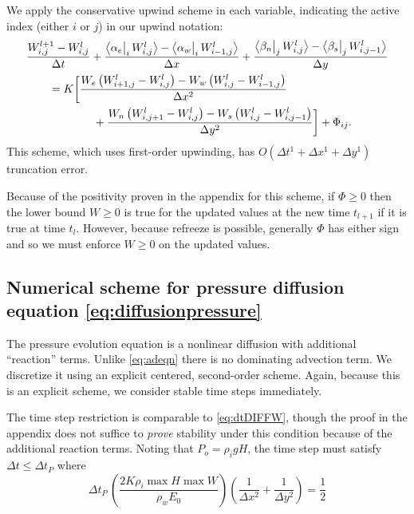 \documentclass[11pt,final]{amsart}%
\newcommand{\Wlij}{W^l_{i,j}}
\newcommand{\upp}[3]{\big<#1\big|_{#3}\,#2\big>}
\begin{document}
We apply the conservative upwind scheme in each variable, indicating the active index (either $i$ or $j$) in our upwind notation:
\begin{align}
 &\frac{W_{i,j}^{l+1} - \Wlij}{\Delta t} + \frac{\upp{\alpha_e}{\Wlij}{i} - \upp{\alpha_w}{W_{i-1,j}^l}{i}}{\Delta x} + \frac{\upp{\beta_n}{\Wlij}{j} - \upp{\beta_s}{W_{i,j-1}^l}{j}}{\Delta y}  \label{eq:Wfd} \\
      &\qquad = K \bigg[\frac{W_e \left(W_{i+1,j}^l - \Wlij\right) - W_w \left(\Wlij - W_{i-1,j}^l\right)}{\Delta x^2}  \notag \\
      &\qquad\qquad\qquad + \frac{W_n \left(W_{i,j+1}^l - \Wlij\right) - W_s \left(\Wlij - W_{i,j-1}^l\right)}{\Delta y^2}\bigg] + \Phi_{ij}. \notag
\end{align}
This scheme, which uses first-order upwinding, has $O(\Delta t^1 + \Delta x^1 + \Delta y^1)$ truncation error.

Because of the positivity proven in the appendix for this scheme, if $\Phi\ge 0$ then the lower bound $W\ge 0$ is true for the updated values at the new time $t_{l+1}$ if it is true at time $t_l$.  However, because refreeze is possible, generally $\Phi$ has either sign and so we must enforce $W\ge 0$ on the updated values.

\subsection*{Numerical scheme for pressure diffusion equation \eqref{eq:diffusionpressure}}  The pressure evolution equation is a nonlinear diffusion with additional ``reaction'' terms.  Unlike \eqref{eq:adeqn} there is no dominating advection term.  We discretize it using an explicit centered, second-order scheme.  Again, because this is an explicit scheme, we consider stable time steps immediately.

The time step restriction is comparable to \eqref{eq:dtDIFFW}, though the proof in the appendix does not suffice to \emph{prove} stability under this condition because of the additional reaction terms.  Noting that $P_o=\rho_i g H$, the time step must satisfy $\Delta t \le \Delta t_P$ where
\begin{equation}
\Delta t_P\, \left(\frac{2 K \rho_i \max H \max W}{\rho_w E_0}\right) \left(\frac{1}{\Delta x^2} + \frac{1}{\Delta y^2}\right) = \frac{1}{2} \label{eq:dtDIFFP}
\end{equation}
\end{document}
